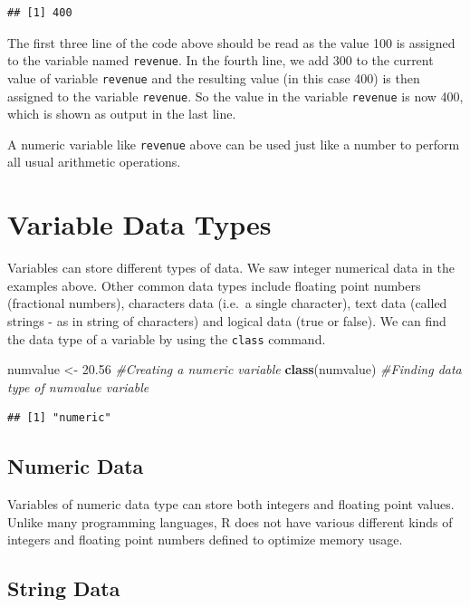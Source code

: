 \documentclass[]{krantz}
\makeatletter
\newenvironment{Shaded}{\begin{snugshade}}{\end{snugshade}}
\newcommand{\KeywordTok}[1]{\textcolor[rgb]{0.27,0.27,0.27}{\textbf{#1}}}
\newcommand{\FloatTok}[1]{\textcolor[rgb]{0.06,0.06,0.06}{#1}}
\newcommand{\StringTok}[1]{\textcolor[rgb]{0.5,0.5,0.5}{#1}}
\newcommand{\CommentTok}[1]{\textcolor[rgb]{0.56,0.35,0.01}{\textit{#1}}}
\newcommand{\NormalTok}[1]{#1}
\newenvironment{kframe}{%
\medskip{}
\setlength{\fboxsep}{.8em}
 \def\at@end@of@kframe{}%
 \ifinner\ifhmode%
  \def\at@end@of@kframe{\end{minipage}}%
  \begin{minipage}{\columnwidth}%
 \fi\fi%
 \def\FrameCommand##1{\hskip\@totalleftmargin \hskip-\fboxsep
 \colorbox{shadecolor}{##1}\hskip-\fboxsep
     \hskip-\linewidth \hskip-\@totalleftmargin \hskip\columnwidth}%
 \MakeFramed {\advance\hsize-\width
   \@totalleftmargin\z@ \linewidth\hsize
   \@setminipage}}%
 {\par\unskip\endMakeFramed%
 \at@end@of@kframe}
\renewenvironment{Shaded}{\begin{kframe}}{\end{kframe}}
\theoremstyle{definition}
\theoremstyle{definition}
\theoremstyle{definition}
\theoremstyle{remark}
\makeatother
\begin{document}
\begin{verbatim}
## [1] 400
\end{verbatim}

The first three line of the code above should be read as the value 100
is assigned to the variable named \texttt{revenue}. In the fourth line,
we add 300 to the current value of variable \texttt{revenue} and the
resulting value (in this case 400) is then assigned to the variable
\texttt{revenue}. So the value in the variable \texttt{revenue} is now
400, which is shown as output in the last line.

A numeric variable like \texttt{revenue} above can be used just like a
number to perform all usual arithmetic operations.

\section{Variable Data Types}\label{variable-data-types}

Variables can store different types of data. We saw integer numerical
data in the examples above. Other common data types include floating
point numbers (fractional numbers), characters data (i.e.~a single
character), text data (called strings - as in string of characters) and
logical data (true or false). We can find the data type of a variable by
using the \texttt{class} command.

\begin{Shaded}
\begin{Highlighting}[]
\NormalTok{numvalue <-}\StringTok{ }\FloatTok{20.56} \CommentTok{#Creating a numeric variable}
\KeywordTok{class}\NormalTok{(numvalue) }\CommentTok{#Finding data type of numvalue variable}
\end{Highlighting}
\end{Shaded}

\begin{verbatim}
## [1] "numeric"
\end{verbatim}

\subsection{Numeric Data}\label{numeric-data}

Variables of numeric data type can store both integers and floating
point values. Unlike many programming languages, R does not have various
different kinds of integers and floating point numbers defined to
optimize memory usage.

\subsection{String Data}\label{string-data}
\end{document}
